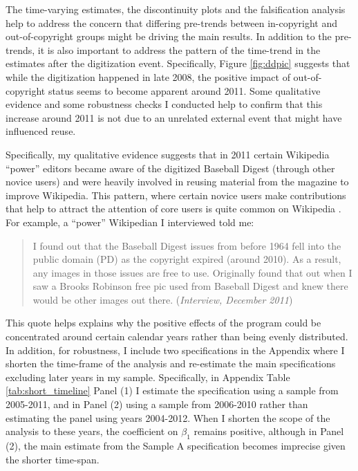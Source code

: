 \documentclass[11pt]{article}
\begin{document}
The time-varying estimates, the discontinuity plots and the falsification analysis help to address the concern that differing pre-trends between in-copyright and out-of-copyright groups might be driving the main results. In addition to the pre-trends, it is also important to address the pattern of the time-trend in the estimates after the digitization event. Specifically, Figure \ref{fig:ddpic} suggests that while the digitization happened in late 2008, the positive impact of out-of-copyright status seems to become apparent around 2011. Some qualitative evidence and some robustness checks I conducted help to confirm that this increase around 2011 is not due to an unrelated external event that might have influenced reuse.

Specifically, my qualitative evidence suggests that in 2011 certain Wikipedia ``power'' editors became aware of the digitized Baseball Digest (through other novice users) and were heavily involved in reusing material from the magazine to improve Wikipedia. This pattern, where certain novice users make contributions that help to attract the attention of core users is quite common on Wikipedia \citep{gorbatai_social_2012}. For example, a ``power'' Wikipedian I interviewed told me:

\begin{quote}
  I found out that the Baseball Digest issues from before 1964 fell into the public domain (PD) as the copyright expired (around 2010). As a result, any images in those issues are free to use. Originally found that out when I saw a Brooks Robinson free pic used from Baseball Digest and knew there would be other images out there. (\emph{Interview, December 2011})
\end{quote}

This quote helps explains why the positive effects of the program could be concentrated around certain calendar years rather than being evenly distributed. In addition, for robustness, I include two specifications in the Appendix where I shorten the time-frame of the analysis and re-estimate the main specifications excluding later years in my sample. Specifically, in Appendix Table \ref{tab:short_timeline} Panel (1) I estimate the specification using a sample from 2005-2011, and in Panel (2) using a sample from 2006-2010 rather than estimating the panel using years 2004-2012. When I shorten the scope of the analysis to these years, the coefficient on $\beta_1$ remains positive, although in Panel (2), the main estimate from the Sample A specification becomes imprecise given the shorter time-span.
\end{document}

